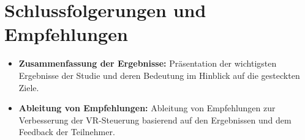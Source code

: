 \section{Schlussfolgerungen und Empfehlungen}
\begin{itemize}
   \item \textbf{Zusammenfassung der Ergebnisse:} Präsentation der wichtigsten Ergebnisse der Studie und deren Bedeutung im Hinblick auf die gesteckten Ziele.
   \item \textbf{Ableitung von Empfehlungen:} Ableitung von Empfehlungen zur Verbesserung der VR-Steuerung basierend auf den Ergebnissen und dem Feedback der Teilnehmer.
\end{itemize}
